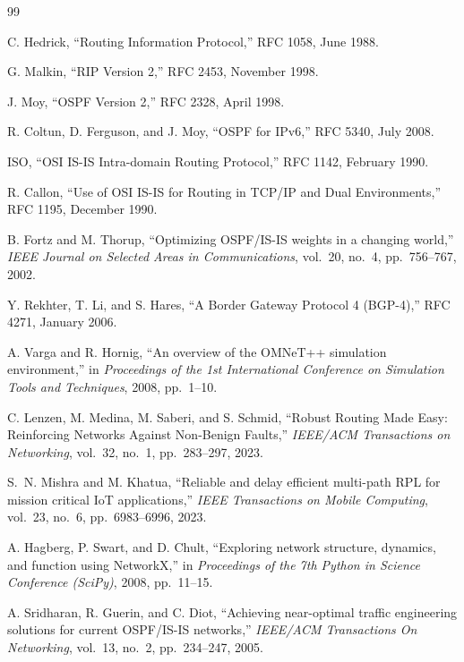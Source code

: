\documentclass[12pt,a4paper]{article}
\begin{document}
\begin{thebibliography}{99}

C. Hedrick, ``Routing Information Protocol,'' RFC 1058, June 1988.

G. Malkin, ``RIP Version 2,'' RFC 2453, November 1998.

J. Moy, ``OSPF Version 2,'' RFC 2328, April 1998.

R. Coltun, D. Ferguson, and J. Moy, ``OSPF for IPv6,'' RFC 5340, July 2008.

ISO, ``OSI IS-IS Intra-domain Routing Protocol,'' RFC 1142, February 1990.

R. Callon, ``Use of OSI IS-IS for Routing in TCP/IP and Dual Environments,''
RFC 1195, December 1990.

B. Fortz and M. Thorup, ``Optimizing OSPF/IS-IS weights in a changing world,''
\textit{IEEE Journal on Selected Areas in Communications}, vol.~20, no.~4,
pp.~756--767, 2002.

Y. Rekhter, T. Li, and S. Hares, ``A Border Gateway Protocol 4 (BGP-4),''
RFC 4271, January 2006.

A. Varga and R. Hornig, ``An overview of the OMNeT++ simulation environment,''
in \textit{Proceedings of the 1st International Conference on Simulation Tools
and Techniques}, 2008, pp.~1--10.

C. Lenzen, M. Medina, M. Saberi, and S. Schmid, ``Robust Routing Made Easy:
Reinforcing Networks Against Non-Benign Faults,'' \textit{IEEE/ACM Transactions
on Networking}, vol.~32, no.~1, pp.~283--297, 2023.

S.~N. Mishra and M. Khatua, ``Reliable and delay efficient multi-path RPL for
mission critical IoT applications,'' \textit{IEEE Transactions on Mobile
Computing}, vol.~23, no.~6, pp.~6983--6996, 2023.

A. Hagberg, P. Swart, and D. Chult, ``Exploring network structure, dynamics,
and function using NetworkX,'' in \textit{Proceedings of the 7th Python in
Science Conference (SciPy)}, 2008, pp.~11--15.

A. Sridharan, R. Guerin, and C. Diot, ``Achieving near-optimal traffic
engineering solutions for current OSPF/IS-IS networks,''
\textit{IEEE/ACM Transactions On Networking}, vol.~13, no.~2,
pp.~234--247, 2005.

\end{thebibliography}
\end{document}
